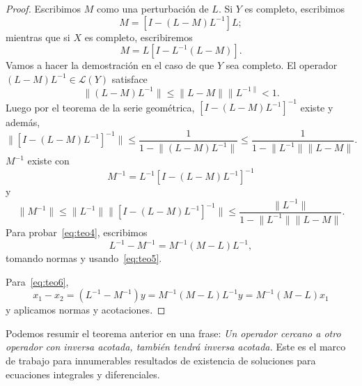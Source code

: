 \begin{proof}
	Escribimos $M$ como una perturbación de $L$. Si $Y$ es completo, escribimos
	\begin{equation}
		M = [I - (L - M)L^{-1}]L;
	\end{equation}
	mientras que si $X$ es completo, escribiremos
	\begin{equation}
		M = L[I - L^{-1}(L - M)].
	\end{equation}
	Vamos a hacer la demostración en el caso de que $Y$ sea completo.
	El operador $(L-M)L^{-1} \in \mathcal{L}(Y)$ satisface
	\begin{equation}
		\lVert (L - M)L^{-1} \rVert \leqslant \lVert L - M \rVert \lVert L^{-1 \rVert} < 1.
	\end{equation}
	Luego por el teorema de la serie geométrica, $[I-(L-M)L^{-1}]^{-1}$ existe y además,
	\begin{equation}
		\lVert [I-(L-M)L^{-1}]^{-1} \rVert \leqslant \dfrac{1}{1 - \lVert (L-M)L^{-1}\rVert} \leqslant \dfrac{1}{1 - \lVert L^{-1} \rVert \lVert L-M \rVert }.
	\end{equation}
	$M^{-1}$ existe con
	\begin{equation}
		M^{-1} = L^{-1}[I-(L-M)L^{-1}]^{-1}
	\end{equation}
	y
	\begin{equation}
		\lVert M^{-1} \rVert \leqslant \lVert L^{-1} \rVert \lVert [I-(L-M)L^{-1}]^{-1} \rVert \leqslant \dfrac{\lVert L^{-1} \rVert}{1 - \lVert L^{-1} \rVert \lVert L-M \rVert}.
	\end{equation}
	Para probar~\eqref{eq:teo4}, escribimos
	\begin{equation}
		L^{-1} - M^{-1} = M^{-1}(M-L)L^{-1},
	\end{equation}
	tomando normas y usando~\eqref{eq:teo5}.
	
	Para~\eqref{eq:teo6},
	\begin{equation}
		x_1 - x_2 = (L^{-1} - M^{-1})y = M^{-1}(M-L)L^{-1}y = M^{-1}(M-L)x_1
	\end{equation}
	y aplicamos normas y acotaciones.
\end{proof}
Podemos resumir el teorema anterior en una frase: \textit{Un operador cercano a otro operador con inversa acotada, también tendrá inversa acotada.} Este es el marco de trabajo para innumerables resultados de existencia de soluciones para ecuaciones integrales y diferenciales.

